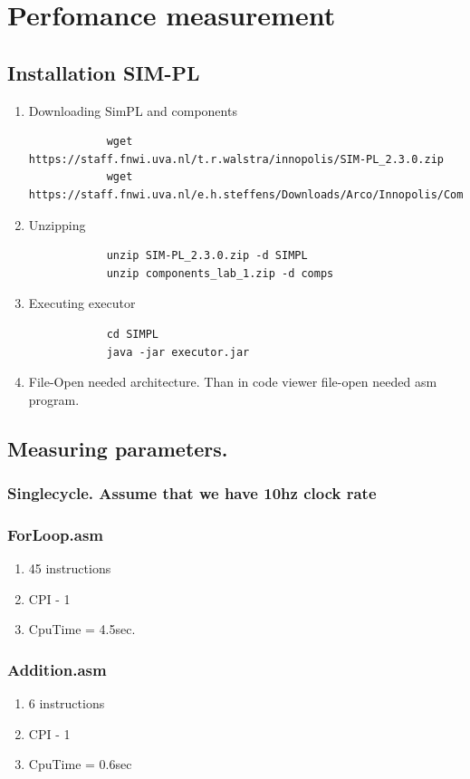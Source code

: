 \documentclass[10pt]{article}
\begin{document}
\section{Perfomance measurement}
\subsection{Installation SIM-PL}
\begin{enumerate}
    \item Downloading SimPL and components
        \begin{verbatim}
            wget https://staff.fnwi.uva.nl/t.r.walstra/innopolis/SIM-­PL_2.3.0.zip
            wget https://staff.fnwi.uva.nl/e.h.steffens/Downloads/Arco/Innopolis/ComponentLab1.zip
        \end{verbatim}
    \item Unzipping
        \begin{verbatim}
            unzip SIM-­PL_2.3.0.zip -d SIMPL
            unzip components_lab_1.zip -d comps
        \end{verbatim}
    \item Executing executor
        \begin{verbatim}
            cd SIMPL
            java -jar executor.jar
        \end{verbatim}
    \item File-Open needed architecture. Than in code viewer file-open needed asm program. 
\end{enumerate}

\subsection{Measuring parameters.}
    \subsubsection{Singlecycle. Assume that we have 10hz clock rate}
        \subsubsection{ForLoop.asm}
        \begin{enumerate}
            \item 45 instructions
            \item CPI - 1
            \item CpuTime = 4.5sec. 
        \end{enumerate}
        \subsubsection{Addition.asm}
        \begin{enumerate}
            \item 6 instructions
            \item CPI - 1
            \item CpuTime = 0.6sec
        \end{enumerate}
\end{document}
